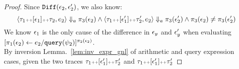 \begin{proof}
%
%
Since $\diff(\event_2, \event_2')$, we also know:
%
\[	
\config{\trace_1 \tracecat [\event_1] \tracecat \trace_2, \expr_2} \aarrow \pi_3(\event_2)
\land 
\config{\trace_1 \tracecat [\event_1'] \tracecat \trace_2', \expr_2} \aarrow \pi_3(\event_2') 
\land 
\pi_3(\event_2) \neq \pi_3(\event_2')
\]
%
We know $\event_1$ is the only cause of the difference in $\event_y$ and $\event_y'$ when evaluating 
$[\assign{\pi_1(\event_2)}{\expr_2 / \query(\qexpr_2)}]{}^{\pi_2(\event_2)}$.
%
\\
By inversion Lemma.~\ref{lem:inv_expr_gnl} of arithmetic and query expression cases, 
given the two traces
$\trace_1 \tracecat [\event_1'] \tracecat \trace_2'$ and 
$\trace_1 \tracecat [\event_1'] \tracecat \trace_2'$ 

\end{proof}
